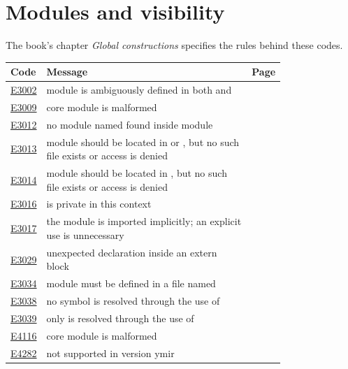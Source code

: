 
\clearpage
\section{Modules and visibility}
\label{sec:codes:modules}

The book's chapter \textit{Global constructions} specifies the rules behind these codes.

\begin{longtable}{@{}l p{0.78\linewidth} r@{}}
\toprule Code & Message & Page\\ \midrule \endhead
\hyperref[sec:codes:e3002]{E3002} & module is ambiguously defined in both \errhole{} and \errhole{} & \pageref{sec:codes:e3002}\\
\hyperref[sec:codes:e3009]{E3009} & core module is malformed & \pageref{sec:codes:e3009}\\
\hyperref[sec:codes:e3012]{E3012} & no module named \errhole{} found inside module \errhole{} & \pageref{sec:codes:e3012}\\
\hyperref[sec:codes:e3013]{E3013} & module should be located in \errhole{} or \errhole{}, but no such file exists or access is denied & \pageref{sec:codes:e3013}\\
\hyperref[sec:codes:e3014]{E3014} & module should be located in \errhole{}, but no such file exists or access is denied & \pageref{sec:codes:e3014}\\
\hyperref[sec:codes:e3016]{E3016} & \errhole{} is private in this context & \pageref{sec:codes:e3016}\\
\hyperref[sec:codes:e3017]{E3017} & the \errhole{} module is imported implicitly; an explicit use is unnecessary & \pageref{sec:codes:e3017}\\
\hyperref[sec:codes:e3029]{E3029} & unexpected declaration inside an extern block & \pageref{sec:codes:e3029}\\
\hyperref[sec:codes:e3034]{E3034} & module \errhole{} must be defined in a file named \errhole{} & \pageref{sec:codes:e3034}\\
\hyperref[sec:codes:e3038]{E3038} & no symbol is resolved through the use of \errhole{} & \pageref{sec:codes:e3038}\\
\hyperref[sec:codes:e3039]{E3039} & only \errhole{} is resolved through the use of \errhole{} & \pageref{sec:codes:e3039}\\
\hyperref[sec:codes:e4116]{E4116} & core module is malformed & \pageref{sec:codes:e4116}\\
\hyperref[sec:codes:e4282]{E4282} & not supported in version ymir \errhole{} & \pageref{sec:codes:e4282}\\
\bottomrule
\end{longtable}

